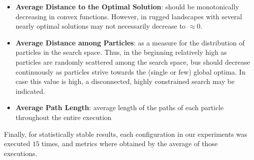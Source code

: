 \documentclass[12pt]{article}
\begin{document}
\begin{itemize}
	\item \textbf{Average Distance to the Optimal Solution}: should be monotonically decreasing in convex functions. However, in rugged landscapes with several nearly optimal solutions may not necessarily decrease to $\approx 0$.
	\item \textbf{Average Distance among Particles}: as a measure for the distribution of particles in the search space. Thus, in the beginning relatively high as particles are randomly scattered among the search space, bus should decrease continuously as particles strive towards the (single or few) global optima. In case this value is high, a disconnected, highly constrained search may be indicated. 
	\item \textbf{Average Path Length}: average length of the paths of each particle throughout the entire execution
		
\end{itemize}

Finally, for statistically stable results, each configuration in our experiments was executed $15$ times, and metrics where obtained by the average of those executions.
%
%
%
\end{document}

